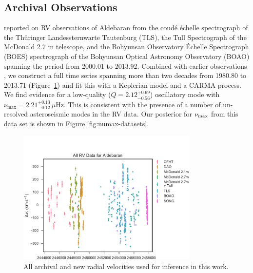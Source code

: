 \documentclass[modern]{aastex61}
\newcommand{\numax}{\mbox{$\nu_{\rm max}$}\xspace}
\newcommand{\twosidedrange}[3]{\ensuremath{#1^{+#2}_{-#3}}}
\newcommand{\HatzesQRange}{\twosidedrange{2.12}{0.69}{0.56}}
\newcommand{\HatzesNuMaxRange}{\twosidedrange{2.21}{0.13}{0.12}}
\begin{document}
\subsection{Archival Observations}
\label{sec:archival-obs}

\citet{Hatzes2015} reported on RV observations of Aldebaran from the coud\'{e}
\'{e}chelle spectrograph of the Th\"{u}ringer Landessternwarte Tautenburg (TLS),
the Tull Spectrograph of the McDonald 2.7 m telescope, and the Bohyunsan
Observatory \'{E}chelle Spectrograph (BOES) spectrograph of the Bohyunsan
Optical Astronomy Observatory (BOAO) spanning the period from 2000.01 to
2013.92.  Combined with earlier observations \citep{hatzes1993}, we construct a
full time series spanning more than two decades from 1980.80 to 2013.71
(Figure~\ref{alldata}) and fit this with a Keplerian model and a CARMA process.
We find evidence for a low-quality ($Q = \HatzesQRange{}$) oscillatory mode with
$\nu_\mathrm{max} = \HatzesNuMaxRange{} \, \mu\mathrm{Hz}$.  This is consistent
with the presence of a number of un-resolved asteroseismic modes in the RV data.
Our posterior for \numax{} from this data set is shown in Figure
\ref{fig:numax-datasets}.

\begin{figure}
\centering
\includegraphics[width=0.8\textwidth]{all-data.pdf}
\caption{All archival and new radial velocities used for inference in this work.}
\label{alldata}
\end{figure}
\end{document}
